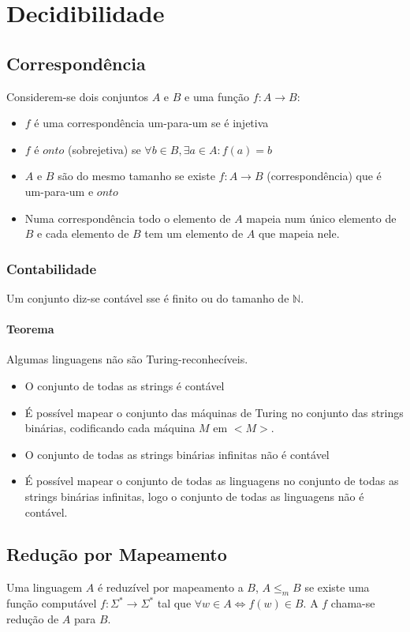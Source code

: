 \documentclass[10pt,a4paper]{report}
\begin{document}
\chapter{Decidibilidade}
\section{Correspondência}
Considerem-se dois conjuntos $A$ e $B$ e uma função $f: A \rightarrow B$:
\begin{itemize}
\item $f$ é uma correspondência um-para-um se é injetiva
\item $f$ é $onto$ (sobrejetiva) se $\forall b \in B, \exists a \in A: f(a) = b$
\item $A$ e $B$ são do mesmo tamanho se existe $f: A \rightarrow B$ (correspondência) que é um-para-um e $onto$
\item Numa correspondência todo o elemento de $A$ mapeia num único elemento de $B$ e cada elemento de $B$ tem um elemento de $A$ que mapeia nele.
\end{itemize}
\subsection{Contabilidade}
Um conjunto diz-se contável sse é finito ou do tamanho de $\mathbb{N}$.
\subsubsection{Teorema}
Algumas linguagens não são Turing-reconhecíveis.
\begin{itemize}
\item O conjunto de todas as strings é contável
\item É possível mapear o conjunto das máquinas de Turing no conjunto das strings binárias, codificando cada máquina $M$ em $<M>$.
\item O conjunto de todas as strings binárias infinitas não é contável
\item É possível mapear o conjunto de todas as linguagens no conjunto de todas as strings binárias infinitas, logo o conjunto de todas as linguagens não é contável.
\end{itemize}
\section{Redução por Mapeamento}
Uma linguagem $A$ é reduzível por mapeamento a $B$, $A \leq_m B$ se existe uma função computável $f:\Sigma^* \rightarrow \Sigma^*$ tal que $\forall w \in A \Leftrightarrow f(w) \in B$. A $f$ chama-se redução de $A$ para $B$.
\end{document}
